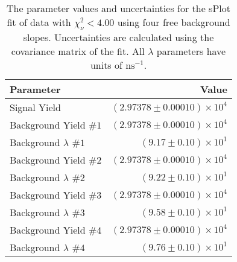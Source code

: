 
\begin{table}[ht]
    \begin{center}
        \begin{tabular}{lr}\toprule
            Parameter & Value \\\midrule
            Signal Yield & $(2.97378 \pm 0.00010) \times 10^{4}$ \\
            Background Yield $\#1$ & $(2.97378 \pm 0.00010) \times 10^{4}$ \\
            Background $\lambda$ $\#1$ & $(9.17 \pm 0.10) \times 10^{1}$ \\
            Background Yield $\#2$ & $(2.97378 \pm 0.00010) \times 10^{4}$ \\
            Background $\lambda$ $\#2$ & $(9.22 \pm 0.10) \times 10^{1}$ \\
            Background Yield $\#3$ & $(2.97378 \pm 0.00010) \times 10^{4}$ \\
            Background $\lambda$ $\#3$ & $(9.58 \pm 0.10) \times 10^{1}$ \\
            Background Yield $\#4$ & $(2.97378 \pm 0.00010) \times 10^{4}$ \\
            Background $\lambda$ $\#4$ & $(9.76 \pm 0.10) \times 10^{1}$ \\\bottomrule
        \end{tabular}
        \caption{The parameter values and uncertainties for the sPlot fit of data with $\chi^2_\nu < 4.00$ using four free background slopes. Uncertainties are calculated using the covariance matrix of the fit. All $\lambda$ parameters have units of $\si{\nano\second}^{-1}$.}\label{tab:splot-fit-results-chisqdof-4.00-free-4}
    \end{center}
\end{table}
